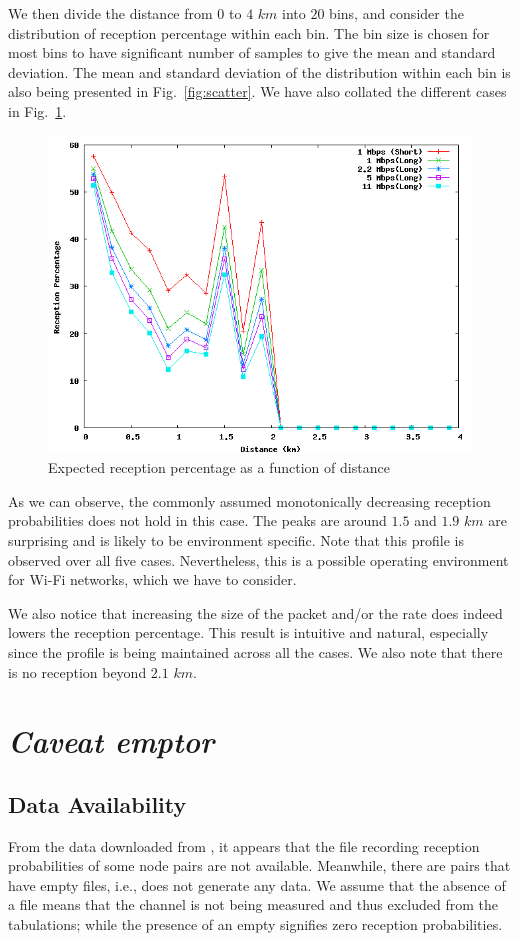 \documentclass[11pt,twocolumn]{article}
\begin{document}
We then divide the distance from $0$ to $4$ $km$ into $20$ bins, and consider the distribution of reception percentage within each bin.  The bin size is chosen for most bins to have significant number of samples to give the mean and standard deviation.  The mean and standard deviation of the distribution within each bin is also being presented in Fig.~\ref{fig:scatter}.  We have also collated the different cases in Fig.~\ref{fig:prob}.  

\begin{figure}[ht]
\centering
\includegraphics[width=0.8\linewidth]{Distro}
\caption{Expected reception percentage as a function of distance}
\label{fig:prob}
\end{figure}

As we can observe, the commonly assumed monotonically decreasing reception probabilities does not hold in this case.  The peaks are around $1.5$ and $1.9$ $km$ are surprising and is likely to be environment specific.  Note that this profile is observed over all five cases.  Nevertheless, this is a possible operating environment for Wi-Fi networks, which we have to consider.

We also notice that increasing the size of the packet and/or the rate does indeed lowers the reception percentage.  This result is intuitive and natural, especially since the profile is being maintained across all the cases.  We also note that there is no reception beyond $2.1$ $km$.

\section{\textit{Caveat emptor}}
\subsection{Data Availability}
From the data downloaded from \cite{roofnetdata}, it appears that the file recording reception probabilities of some node pairs are not available.  Meanwhile, there are pairs that have empty files, i.e., does not generate any data.  We assume that the absence of a file means that the channel is not being measured and thus excluded from the tabulations; while the presence of an empty signifies zero reception probabilities.
\end{document}

